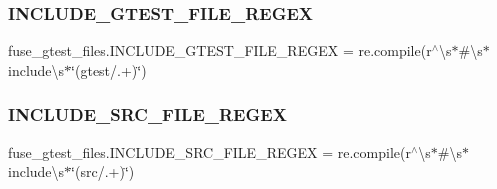 \subsubsection{\texorpdfstring{INCLUDE\_GTEST\_FILE\_REGEX}{INCLUDE\_GTEST\_FILE\_REGEX}}
{\footnotesize\ttfamily fuse\+\_\+gtest\+\_\+files.\+I\+N\+C\+L\+U\+D\+E\+\_\+\+G\+T\+E\+S\+T\+\_\+\+F\+I\+L\+E\+\_\+\+R\+E\+G\+EX = re.\+compile(r\textquotesingle{}$^\wedge$\textbackslash{}s$\ast$\#\textbackslash{}s$\ast$include\textbackslash{}s$\ast$\char`\"{}(gtest/.+)\char`\"{}\textquotesingle{})}

\mbox{\label{namespacefuse__gtest__files_aec4e054d0ab27276d6150468bb98a8a4}} 
\subsubsection{\texorpdfstring{INCLUDE\_SRC\_FILE\_REGEX}{INCLUDE\_SRC\_FILE\_REGEX}}
{\footnotesize\ttfamily fuse\+\_\+gtest\+\_\+files.\+I\+N\+C\+L\+U\+D\+E\+\_\+\+S\+R\+C\+\_\+\+F\+I\+L\+E\+\_\+\+R\+E\+G\+EX = re.\+compile(r\textquotesingle{}$^\wedge$\textbackslash{}s$\ast$\#\textbackslash{}s$\ast$include\textbackslash{}s$\ast$\char`\"{}(src/.+)\char`\"{}\textquotesingle{})}

